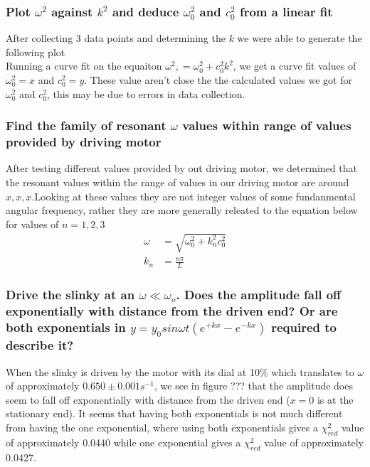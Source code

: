 \documentclass{article}
\begin{document}
\newpage
\subsubsection*{Plot $\omega^2$ against $k^2$ and deduce $\omega_0^2$ and $c^2_0$
from a linear fit}
After collecting 3 data points and determining the $k$ we were able to generate
the following plot\\
Running a curve fit on the equaiton $\omega^2, = \omega_0^2 + c_0^2k^2$, we get
a curve fit values of $\omega_0^2 = x$ and $c_0^2 = y$. These value aren't close
the the calculated values we got for $\omega_0^2$ and $c_0^2$, this may be due
to errors in data collection.



\subsubsection*{Find the family of resonant $\omega$ values within range of
values provided by driving motor}
After testing different values provided by out driving motor, we determined that
the resonant values within the range of values in our driving motor are around
$x, x, x$.Looking at these values they are not integer values of some
fundanmental angular frequency, rather they are more generally releated to the
equation below for values of $n = 1,2,3$
\begin{align*}
    \omega &= \sqrt{\omega_0^2 + k_n^2c_0^2}\\
    k_n &= \frac{n\pi}{L}
\end{align*}

\subsubsection*{Drive the slinky at an $\omega\ll\omega_{o}$.  
Does the amplitude fall off exponentially with distance
from the driven end?  Or are both exponentials in $y=y_{0}sin\omega 
t(e^{+kx}-e^{-kx})$ required to describe it?}
When the slinky is driven by the motor with its dial at 10\% which translates 
to $\omega$ of approximately $0.650\pm0.001s^{-1}$, we see in figure ??? 
that the amplitude does seem to fall off exponentially with distance from
the driven end ($x=0$ is at the stationary end).  It seems that having both
exponentials is not much different from having the one exponential, where 
using both exponentials gives a $\chi_{red}^{2}$ value of approximately 
0.0440 while one exponential gives a $\chi_{red}^{2}$ value of approximately 
0.0427.
\end{document}
